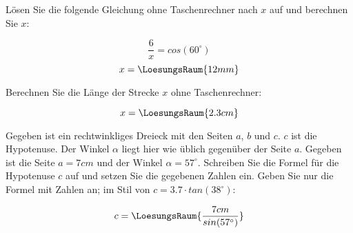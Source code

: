 
\begin{frage}[1]
  Lösen Sie die folgende Gleichung ohne Taschenrechner nach $x$ auf und berechnen Sie $x$:

  $$\frac{6}{x}=cos(60^\circ)$$
  \vspace{7mm}
  $$x = \LoesungsRaum{12mm}$$

\end{frage}


\begin{frage}[1]
 Berechnen Sie die Länge der Strecke $x$ ohne Taschenrechner: 
\begin{center}
\end{center}

$$x=\LoesungsRaum{2.3cm}$$

\end{frage}
  


%
%  


\begin{frage}[2]
  Gegeben ist ein rechtwinkliges Dreieck mit den Seiten $a$, $b$ und
  $c$. $c$ ist die Hypotenuse. Der Winkel $\alpha$ liegt hier wie
  üblich gegenüber der Seite $a$.
  Gegeben ist die Seite $a = 7cm$ und der Winkel $\alpha = 57^\circ$.
  Schreiben Sie die Formel für die Hypotenuse $c$ auf und setzen Sie
  die gegebenen Zahlen ein. Geben Sie nur die Formel mit Zahlen an; im Stil von
  $c = 3.7 \cdot tan(38^\circ)$:
  
  \vspace{7mm}
  
  $$c = \LoesungsRaum{\frac{7cm}{sin(57^\circ)}}$$

\end{frage}
